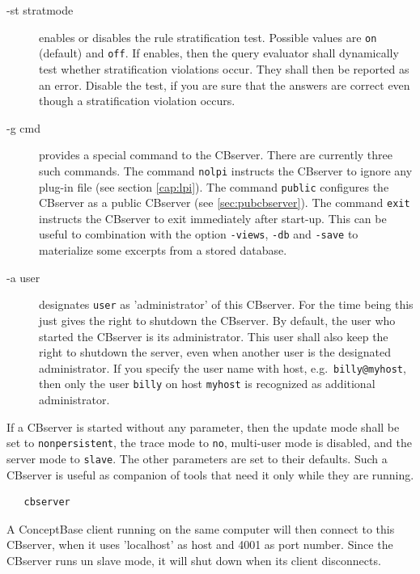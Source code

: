 \begin{description}
\item[-st stratmode] enables or disables the rule stratification test. Possible values are
{\tt on} (default) and {\tt off}. If enables, then the query evaluator shall
dynamically test whether stratification violations occur. They shall then
be reported as an error. Disable the test, if you are sure that the answers
are correct even though a stratification violation occurs.

\item[-g cmd] provides a special command to the CBserver. There are currently
three such commands. The command {\tt nolpi} instructs the CBserver to ignore
any plug-in file (see section \ref{cap:lpi}). The command {\tt public} configures
the CBserver as a public CBserver (see \ref{sec:pubcbserver}).
The command
{\tt exit} instructs the CBserver to exit immediately after start-up. This can
be useful to combination with the option {\tt -views}, {\tt -db} and {\tt -save}
to materialize some excerpts from a stored database.

\item[-a user] designates {\tt user} as 'administrator' of this CBserver. 
For the time being this just gives the right to shutdown the CBserver. By default,
the user who started the CBserver is its administrator. This user shall
also keep the right to shutdown the server, even when another user is the
designated administrator. If you specify the user name with host, e.g.\ 
{\tt billy@myhost}, then only the user {\tt billy} on host {\tt myhost} is
recognized as additional administrator. 


\end{description}


\vspace{0.5cm}

If a CBserver is started without any parameter, then the update mode shall be set
to {\tt nonpersistent}, the trace mode to {\tt no}, multi-user mode is disabled,
and the server mode to {\tt slave}. The other parameters are set to their defaults.
Such a CBserver is useful as companion of tools that need it only while they
are running. 

\begin{verbatim}
   cbserver
\end{verbatim}

A ConceptBase client running on the same computer will then connect to this
CBserver, when it uses 'localhost' as host and 4001 as port number. Since
the CBserver runs un slave mode, it will shut down when its client disconnects.

